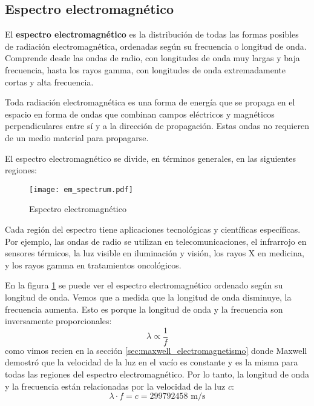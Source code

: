 \subsection{Espectro electromagnético}

El \textbf{espectro electromagnético} es la distribución de todas las formas posibles de radiación electromagnética, ordenadas según su frecuencia o longitud de onda. Comprende desde las ondas de radio, con longitudes de onda muy largas y baja frecuencia, hasta los rayos gamma, con longitudes de onda extremadamente cortas y alta frecuencia.

Toda radiación electromagnética es una forma de energía que se propaga en el espacio en forma de ondas que combinan campos eléctricos y magnéticos perpendiculares entre sí y a la dirección de propagación. Estas ondas no requieren de un medio material para propagarse.

El espectro electromagnético se divide, en términos generales, en las siguientes regiones:

\begin{figure}[ht]
  \centering
  \texttt{[image: em\_spectrum.pdf]}
  \caption{Espectro electromagnético}
  \label{fig:em_spectrum}
\end{figure}

Cada región del espectro tiene aplicaciones tecnológicas y científicas específicas. Por ejemplo, las ondas de radio se utilizan en telecomunicaciones, el infrarrojo en sensores térmicos, la luz visible en iluminación y visión, los rayos X en medicina, y los rayos gamma en tratamientos oncológicos.

En la figura \ref{fig:em_spectrum} se puede ver el espectro electromagnético ordenado según su longitud de onda. Vemos que a medida que la longitud de onda disminuye, la frecuencia aumenta. Esto es porque la longitud de onda y la frecuencia son inversamente proporcionales:
\[
  \lambda \propto \frac{1}{f}
\]
como vimos recien en la sección \ref{sec:maxwell_electromagnetismo} donde Maxwell demostró que la velocidad de la luz en el vacío es constante y es la misma para todas las regiones del espectro electromagnético. Por lo tanto, la longitud de onda y la frecuencia están relacionadas por la velocidad de la luz \(c\):
\[
  \lambda \cdot f = c = 299792458 \text{ m/s}
\]